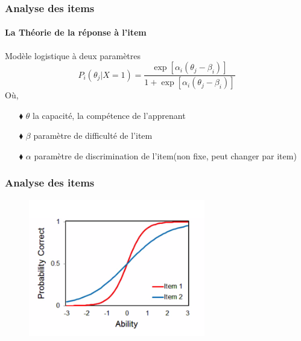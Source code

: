 \documentclass[aspectratio=169,professionalfonts, 12pt]{beamer}
\begin{document}
\begin{frame}
  \frametitle{Analyse des items}
  \framesubtitle{La Théorie de la réponse à l'item}
  \justifying
  \begin{minipage}{\textwidth}
  \begin{block}{Modèle logistique à deux paramètres}
    \begin{equation}
      P_{i}(\theta_{j} | X=1) = \frac{\exp \left[ \alpha_{i}(\theta_{j}-\beta_{i}) \right]  }{1+ \exp \left[ \alpha_{i}(\theta_{j}-\beta_{i}) \right]  } 
    \end{equation}
    Où, \\
    \begin{itemize}
      \item[$\blacklozenge$] \(\displaystyle \theta \) la capacité, la compétence de l'apprenant 
      \item[$\blacklozenge$] \(\displaystyle \beta \) paramètre de difficulté de l'item
      \item[$\blacklozenge$] \(\displaystyle \alpha \) paramètre de discrimination de l'item(non fixe, peut changer par item)
    \end{itemize}
  \end{block}  
  \end{minipage} 
\end{frame}

\begin{frame}
  \frametitle{Analyse des items}
  \justifying 
  \begin{minipage}{\textwidth}
  \begin{figure}[H]
      \includegraphics[height=6cm]{images/etat_art/2pl.png}
  \end{figure}
  \end{minipage}
\end{frame}
\end{document}
